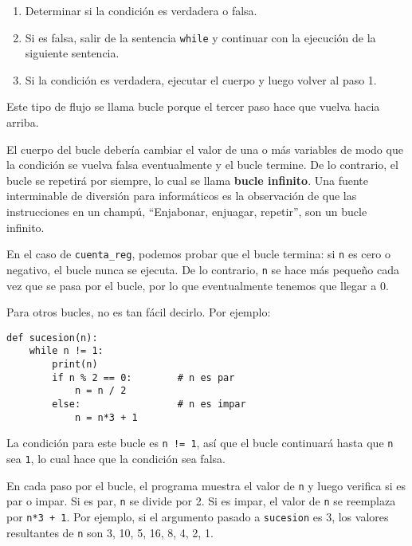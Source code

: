 \documentclass[10pt]{book}
\begin{document}
\begin{enumerate}

\item Determinar si la condición es verdadera o falsa.

\item Si es falsa, salir de la sentencia {\tt while}
y continuar con la ejecución de la siguiente sentencia.

\item Si la condición es verdadera, ejecutar el
cuerpo y luego volver al paso 1.

\end{enumerate}

Este tipo de flujo se llama bucle porque el tercer paso
hace que vuelva hacia arriba.

El cuerpo del bucle debería cambiar el valor de una o más variables
de modo que la condición se vuelva falsa eventualmente y el bucle
termine.  De lo contrario, el bucle se repetirá por siempre, lo cual se llama
{\bf bucle infinito}.  Una fuente interminable de diversión para
informáticos es la observación de que las instrucciones en un champú,
``Enjabonar, enjuagar, repetir'', son un bucle infinito.

En el caso de {\tt cuenta\_reg}, podemos probar que el bucle
termina: si {\tt n} es cero o negativo, el bucle nunca se ejecuta.
De lo contrario, {\tt n} se hace más pequeño cada vez que se pasa por
el bucle, por lo que eventualmente tenemos que llegar a 0.

Para otros bucles, no es tan fácil decirlo.  Por ejemplo:

\begin{verbatim}
def sucesion(n):
    while n != 1:
        print(n)
        if n % 2 == 0:        # n es par
            n = n / 2
        else:                 # n es impar
            n = n*3 + 1
\end{verbatim}
%
La condición para este bucle es {\tt n != 1}, así que el bucle continuará
hasta que {\tt n} sea {\tt 1}, lo cual hace que la condición sea falsa.

En cada paso por el bucle, el programa muestra el valor de {\tt n}
y luego verifica si es par o impar.  Si es par, {\tt n} se
divide por 2.  Si es impar, el valor de {\tt n} se reemplaza por
{\tt n*3 + 1}. Por ejemplo, si el argumento pasado a {\tt sucesion}
es 3, los valores resultantes de {\tt n} son 3, 10, 5, 16, 8, 4, 2, 1.
\end{document}

